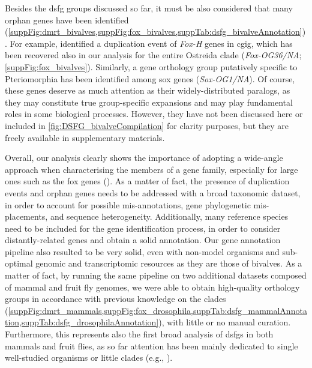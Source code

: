 Besides the \gls{dsfg} groups discussed so far, it must be also considered that many orphan genes have been identified (\cref{suppFig:dmrt_bivalves,suppFig:fox_bivalves,suppTab:dsfg_bivalveAnnotation}). For example, \textbf{\cite{wu2020identification}} identified a duplication event of \textit{Fox-H} genes in \gls{cgig}, which has been recovered also in our analysis for the entire Ostreida clade (\textit{Fox-OG36/NA}; \cref{suppFig:fox_bivalves}). Similarly, a gene orthology group putatively specific to Pteriomorphia has been identified among \gls{sox} genes (\textit{Sox-OG1/NA}). Of course, these genes deserve as much attention as their widely-distributed paralogs, as they may constitute true group-specific expansions and may play fundamental roles in some biological processes. However, they have not been discussed here or included in \cref{fig:DSFG_bivalveCompilation} for clarity purposes, but they are freely available in supplementary materials.

Overall, our analysis clearly shows the importance of adopting a wide-angle approach when characterising the members of a gene family, especially for large ones such as the \gls{fox} genes (\textbf{\cite{schomburg2022phylogenetic}}). As a matter of fact, the presence of duplication events and orphan genes needs to be addressed with a broad taxonomic dataset, in order to account for possible mis-annotations, gene phylogenetic mis-placements, and sequence heterogeneity. Additionally, many reference species need to be included for the gene identification process, in order to consider distantly-related genes and obtain a solid annotation. Our gene annotation pipeline also resulted to be very solid, even with non-model organisms and sub-optimal genomic and transcriptomic resources as they are those of bivalves. As a matter of fact, by running the same pipeline on two additional datasets composed of mammal and fruit fly genomes, we were able to obtain high-quality orthology groups in accordance with previous knowledge on the clades (\cref{suppFig:dmrt_mammals,suppFig:fox_drosophila,suppTab:dsfg_mammalAnnotation,suppTab:dsfg_drosophilaAnnotation}), with little or no manual curation. Furthermore, this represents also the first broad analysis of \glspl{dsfg} in both mammals and fruit flies, as so far attention has been mainly dedicated to single well-studied organisms or little clades (e.g., \textbf{\cite{jackson2010update}}).

